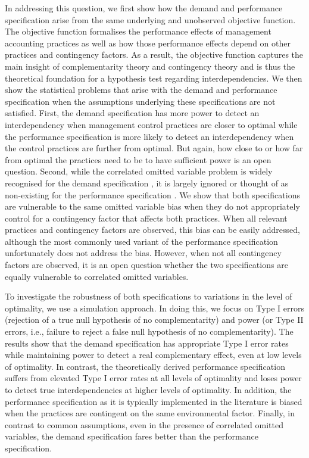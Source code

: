 \documentclass[12pt]{article}
\begin{document}
In addressing this question, we first show how the demand and performance specification arise from the same underlying and unobserved objective function. The objective function formalises the performance effects of management accounting practices as well as how those performance effects depend on other practices and contingency factors. As a result, the objective function captures the main insight of complementarity theory \citep{milgrom_complementarities_1995,grabner_management_2013} and contingency theory \citep{chenhall_management_2003,otley_contingency_2016} and is thus the theoretical foundation for a hypothesis test regarding interdependencies. We then show the statistical problems that arise with the demand and performance specification when the assumptions underlying these specifications are not satisfied. First, the demand specification has more power to detect an interdependency when management control practices are closer to optimal while the performance specification is more likely to detect an interdependency when the control practices are further from optimal. But again, how close to or how far from optimal the practices need to be to have sufficient power is an open question. Second, while the correlated omitted variable problem is widely recognised for the demand specification \citep{grabner_management_2013, arora_testing_1996, hofmann_organizational_2017}, it is largely ignored \citep{grabner_management_2013, hofmann_organizational_2017} or thought of as non-existing for the performance specification \citep{carree_note_2011}. We show that both specifications are vulnerable to the same omitted variable bias when they do not appropriately control for a contingency factor that affects both practices. When all relevant practices and contingency factors are observed, this bias can be easily addressed, although the most commonly used variant of the performance specification unfortunately does not address the bias. However, when not all contingency factors are observed, it is an open question whether the two specifications are equally vulnerable to correlated omitted variables.

To investigate the robustness of both specifications to variations in the level of optimality, we use a simulation approach. In doing this, we focus on Type I errors (rejection of a true null hypothesis of no complementarity) and power (or Type II errors, i.e., failure to reject a false null hypothesis of no complementarity). The results show that the demand specification has appropriate Type I error rates while maintaining power to detect a real complementary effect, even at low levels of optimality. In contrast, the theoretically derived performance specification suffers from elevated Type I error rates at all levels of optimality and loses power to detect true interdependencies at higher levels of optimality. In addition, the performance specification as it is typically implemented in the literature is biased when the practices are contingent on the same environmental factor. Finally, in contrast to common assumptions, even in the presence of correlated omitted variables, the demand specification fares better than the performance specification.
\end{document}
